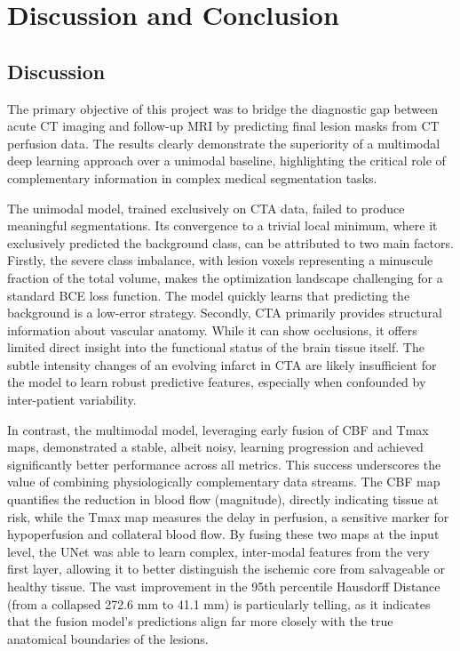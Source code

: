 \chapter{Discussion and Conclusion}
\label{chap:discussion_conclusion}

\section{Discussion}
\label{sec:discussion}

The primary objective of this project was to bridge the diagnostic gap between acute CT imaging and follow-up MRI by predicting final lesion masks from CT perfusion data. The results clearly demonstrate the superiority of a multimodal deep learning approach over a unimodal baseline, highlighting the critical role of complementary information in complex medical segmentation tasks.

The unimodal model, trained exclusively on CTA data, failed to produce meaningful segmentations. Its convergence to a trivial local minimum, where it exclusively predicted the background class, can be attributed to two main factors. Firstly, the severe class imbalance, with lesion voxels representing a minuscule fraction of the total volume, makes the optimization landscape challenging for a standard BCE loss function. The model quickly learns that predicting the background is a low-error strategy. Secondly, CTA primarily provides structural information about vascular anatomy. While it can show occlusions, it offers limited direct insight into the functional status of the brain tissue itself. The subtle intensity changes of an evolving infarct in CTA are likely insufficient for the model to learn robust predictive features, especially when confounded by inter-patient variability.

In contrast, the multimodal model, leveraging early fusion of CBF and Tmax maps, demonstrated a stable, albeit noisy, learning progression and achieved significantly better performance across all metrics. This success underscores the value of combining physiologically complementary data streams. The CBF map quantifies the reduction in blood flow (magnitude), directly indicating tissue at risk, while the Tmax map measures the delay in perfusion, a sensitive marker for hypoperfusion and collateral blood flow. By fusing these two maps at the input level, the UNet was able to learn complex, inter-modal features from the very first layer, allowing it to better distinguish the ischemic core from salvageable or healthy tissue. The vast improvement in the 95th percentile Hausdorff Distance (from a collapsed 272.6 mm to 41.1 mm) is particularly telling, as it indicates that the fusion model's predictions align far more closely with the true anatomical boundaries of the lesions.

